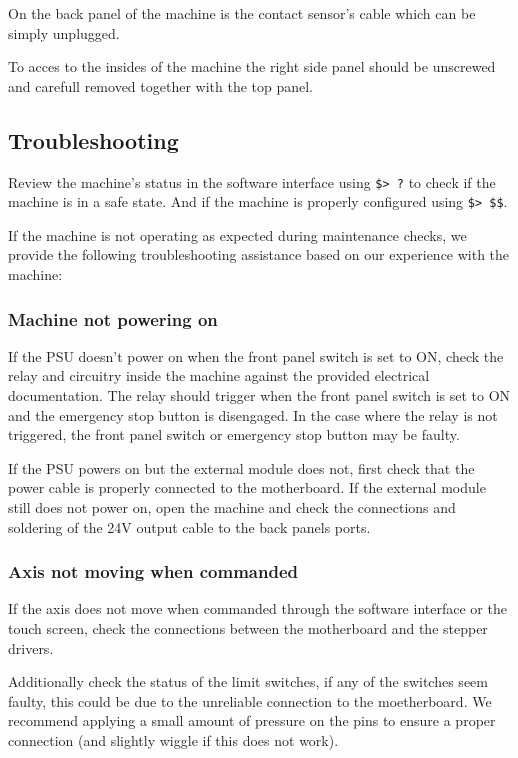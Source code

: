 \documentclass[11pt, openright]{book}
\begin{document}
    On the back panel of the machine is the contact sensor's cable which can be simply unplugged.

    To acces to the insides of the machine the right side panel should be unscrewed and carefull removed together with the top panel. 


    \subsection{Troubleshooting}

     Review the machine's status in the software interface using \texttt{\$> ?} to check if the machine is in a safe state. And if the machine is properly configured using \texttt{\$> \$\$}. 

    If the machine is not operating as expected during maintenance checks, we provide the following troubleshooting assistance based on our experience with the machine: 

     \subsubsection{Machine not powering on}
     
     If the PSU doesn't power on when the front panel switch is set to ON, check the relay and circuitry inside the machine against the provided electrical documentation. The relay should trigger when the front panel switch is set to ON and the emergency stop button is disengaged. In the case where the relay is not triggered, the front panel switch or emergency stop button may be faulty.
     
     If the PSU powers on but the external module does not, first check that the power cable is properly connected to the motherboard. If the external module still does not power on, open the machine and check the connections and soldering of the 24V output cable to the back panels ports. 

      \subsubsection{Axis not moving when commanded}

        If the axis does not move when commanded through the software interface or the touch screen, check the connections between the motherboard and the stepper drivers.

        Additionally check the status of the limit switches, if any of the switches seem faulty, this could be due to the unreliable connection to the moetherboard. We recommend applying a small amount of pressure on the pins to ensure a proper connection (and slightly wiggle if this does not work). 
\end{document}
